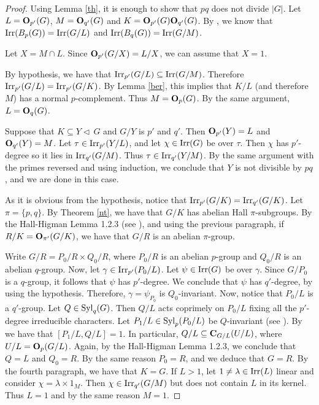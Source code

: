 \documentclass[12pt,leqno,a4paper]{amsart}
\def\syl#1#2{{\rm Syl}_#1(#2)}
\def\nor{\triangleleft\,}
\def\oh#1#2{{\bf O}_{#1}(#2)}
\def\irr#1{{\rm Irr}(#1)}
\def\cent#1#2{{\bf C}_{#1}(#2)}
\def\irrp#1#2{{\rm Irr}_{#1'}(#2)}
\def\sbs{\subseteq}
\theoremstyle{remark}
\begin{document}
\begin{proof} Using Lemma \ref{th}, it is enough to show that $pq$ does not divide $|G|$.
Let $L= \oh{p'} G$, $M=\oh{q'} G$
and  $K=\oh{p'}G\oh{q'}G$. By \cite[Theorem 10.20]{nbook}, we know that 
$\irr{{B_p}(G)}=\irr{G/L}$ and $\irr{B_q(G)}=\irr{G/M}$.

Let $X=M \cap L$.  Since $\oh{p'}{G/X}=L/X$, we can assume that $X=1$.


By hypothesis, we have that $\irrp{p}{G/L} \sbs \irr{G/M}$.
Therefore ${\rm Irr}_{p'}(G/L)={\rm Irr}_{p'}(G/K)$.
By Lemma \ref{ber}, this implies that $K/L$ (and therefore $M$) has a normal $p$-complement. Thus $M=\oh p G$.   By the same argument, $L=\oh qG$.  

Suppose that $K \sbs Y \nor G$ and $G/Y$ is $p'$ and $q'$.  Then $\oh{p'}Y=L$
and $\oh{q'}Y=M$. Let $\tau \in \irrp{p}{Y/L}$, and let $\chi \in \irr G$ be over $\tau$. Then $\chi$ has $p'$-degree so it lies in $\irrp{q}{G/M}$. Thus $\tau \in \irrp{q}{Y/M}$. By the same
argument with the primes reversed and using induction, 
we conclude that $Y$ is not divisible by $pq$, and we are done in this case.

As it is obvious from the hypothesis, notice 
that $\irrp{p}{G/K}=\irrp{q}{G/K}$.   Let $\pi=\{p,q \}$.  By Theorem \ref{nt}, we have that $G/K$ has
abelian Hall $\pi$-subgroups. By the Hall-Higman Lemma 1.2.3 (see \cite[Theorem 3.21]{Is2}), and using the previous paragraph,
if $R/K= \oh{\pi'}{G/K}$, we have that $G/R$ is an abelian $\pi$-group.

Write $G/R=P_0/R \times Q_0/R$, where $P_0/R$ is an abelian $p$-group and $Q_0/R$ is
an abelian $q$-group.  Now, let $\gamma \in {\rm Irr}_{p'}(P_0/L)$. Let $\psi \in \irr G$ be over $\gamma$. Since $G/P_0$ is a $q$-group,
it follows that $\psi$ has $p'$-degree.
 We conclude that  $\psi$ has $q'$-degree, by using the hypothesis. Therefore, 
$\gamma=\psi_{P_0}$ is $Q_0$-invariant.  Now, notice that
$P_0/L$ is a $q'$-group.
Let $Q \in \syl qG$. 
Then $Q/L$ acts coprimely on $P_0/L$ fixing all the $p'$-degree irreducible
characters. Let $P_1/L\in{\rm Syl}_{p}(P_0/L)$ be $Q$-invariant (see \cite[Theorem 3.23]{Is2}). By \cite[Corollary B]{MN11} we have that   $[P_1/L,Q/L]=1$.
In particular,  $Q/L \sbs \cent{G/L}{U/L}$, where $U/L=\oh p{G/L}$.
Again, by the Hall-Higman Lemma 1.2.3, 
we conclude that $Q=L$ and $Q_0=R$. By the same reason $P_0=R$,
and we deduce that $G=R$. By the fourth paragraph,
we have that $K=G$.  If $L>1$, let $1 \ne \lambda \in \irr{L}$ linear
and consider $\chi=\lambda \times 1_M$. Then $\chi \in \irrp{q}{G/M}$
but does not contain $L$ in its kernel. Thus $L=1$ and by the same
reason $M=1$.  
\end{proof}
\end{document}
